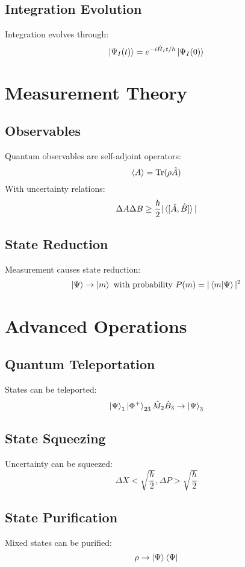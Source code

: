 \documentclass[12pt]{article}
\begin{document}
\subsection{Integration Evolution}
Integration evolves through:
\begin{equation}
\ket{\Psi_I(t)} = e^{-i\hat{H}_It/\hbar}\ket{\Psi_I(0)}
\end{equation}
\section{Measurement Theory}
\subsection{Observables}
Quantum observables are self-adjoint operators:
\begin{equation}
\braket{A} = \text{Tr}(\rho\hat{A})
\end{equation}
With uncertainty relations:
\begin{equation}
\Delta A\Delta B \geq \frac{\hbar}{2}|\braket{[\hat{A},\hat{B}]}|
\end{equation}
\subsection{State Reduction}
Measurement causes state reduction:
\begin{equation}
\ket{\Psi} \rightarrow \ket{m} \text{ with probability } P(m) = |\braket{m|\Psi}|^2
\end{equation}
\section{Advanced Operations}
\subsection{Quantum Teleportation}
States can be teleported:
\begin{equation}
\ket{\Psi}_1\ket{\Phi^+}_{23}\hat{M}_2\hat{B}_3 \rightarrow \ket{\Psi}_3
\end{equation}
\subsection{State Squeezing}
Uncertainty can be squeezed:
\begin{equation}
\Delta X < \sqrt{\frac{\hbar}{2}}, \Delta P > \sqrt{\frac{\hbar}{2}}
\end{equation}
\subsection{State Purification}
Mixed states can be purified:
\begin{equation}
\rho \rightarrow \ket{\Psi}\bra{\Psi}
\end{equation}
\end{document}
